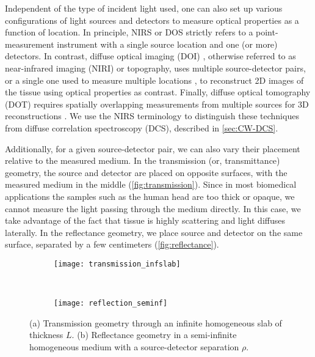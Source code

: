 Independent of the type of incident light used, one can also set up various configurations of light sources and detectors to measure optical properties as a function of location. In principle, NIRS or DOS strictly refers to a point-measurement instrument with a single source location and one (or more) detectors. In contrast, diffuse optical imaging (DOI) \cite{Strangman2002}, otherwise referred to as near-infrared imaging (NIRI) or topography, \cite{Scholkmann2013} uses multiple source-detector pairs, or a single one used to measure multiple locations \cite[ch. 9.1.4]{Handbook}, to reconstruct 2D images of the tissue using optical properties as contrast. Finally, diffuse optical tomography (DOT) requires spatially overlapping measurements from multiple sources for 3D reconstructions \cite[ch. 2.4.2]{Madsen2013}. We use the NIRS terminology to distinguish these techniques from diffuse correlation spectroscopy (DCS), described in \autoref{sec:CW-DCS}. 

Additionally, for a given source-detector pair, we can also vary their placement relative to the measured medium. In the transmission (or, transmittance) geometry, the source and detector are placed on opposite surfaces, with the measured medium in the middle (\autoref{fig:transmission}). Since in most biomedical applications the samples such as the human head are too thick or opaque, we cannot measure the light passing through the medium directly. In this case, we take advantage of the fact that tissue is highly scattering and light diffuses laterally. In the reflectance geometry, we place source and detector on the same surface, separated by a few centimeters (\autoref{fig:reflectance}).
\begin{figure}[tb]
        \centering
    \begin{subfigure}{0.5\textwidth}
        \centering
        \texttt{[image: transmission\_infslab]}
        \caption{}
        \label{fig:transmission}
    \end{subfigure}~%
    \begin{subfigure}{0.5\textwidth}
        \centering
        \texttt{[image: reflection\_seminf]}
        \caption{}
        \label{fig:reflectance}
    \end{subfigure}  
    \caption{(a) Transmission geometry through an infinite homogeneous slab of thickness $L$. (b) Reflectance geometry in a semi-infinite homogeneous medium with a source-detector separation $\rho$.}
    \label{fig:geometry}
\end{figure}


